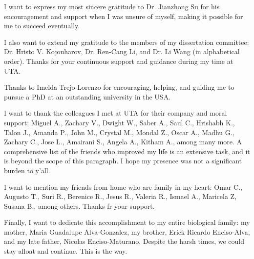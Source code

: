 

I want to express my most sincere gratitude to Dr. Jianzhong Su for his encouragement and support when I was unsure of myself, making it possible for me to succeed eventually.

I also want to extend my gratitude to the members of my dissertation committee: Dr. Hristo V. Kojouharov, Dr. Ren-Cang Li, and Dr. Li Wang (in alphabetical order).
%
Thanks for your continuous support and guidance during my time at UTA.

Thanks to Imelda Trejo-Lorenzo for encouraging, helping, and guiding me to pursue a PhD at an outstanding university in the USA.

I want to thank the colleagues I met at UTA for their company and moral support: Miguel A., Zachary V., Dwight W., Saber A., Saul C., Hrishabh K., Talon J., Amanda P., John M., Crystal M., Mondal Z., Oscar A., Madhu G., Zachary C., Jose L., Amairani S., Angela A., Kitham A., among many more.
%
A comprehensive list of the friends who improved my life is an extensive task, and it is beyond the scope of this paragraph.
%
I hope my presence was not a significant burden to y'all.

I want to mention my friends from home who are family in my heart: Omar C., Augusto T., Suri R., Berenice R., Jesus R., Valeria R., Ismael A., 
Maricela Z, Susana B., among others.
%
Thanks fr your support.

Finally, I want to dedicate this accomplishment to my entire biological family: my mother, Maria Guadalupe Alva-Gonzalez, my brother, Erick Ricardo Enciso-Alva, and my late father, Nicolas Enciso-Maturano.
%
Despite the harsh times, we could stay afloat and continue.
%
This is the way.